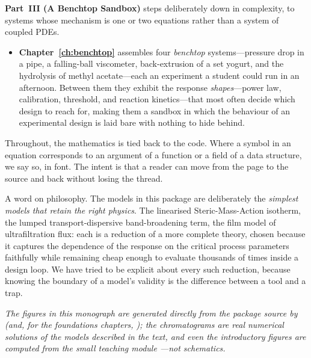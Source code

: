 \textbf{Part~III (A Benchtop Sandbox)} steps deliberately down in complexity, to
systems whose mechanism is one or two equations rather than a system of coupled
PDEs.

\begin{itemize}
  \item \textbf{Chapter~\ref{ch:benchtop}} assembles four \emph{benchtop}
  systems---pressure drop in a pipe, a falling-ball viscometer, back-extrusion of
  a set yogurt, and the hydrolysis of methyl acetate---each an experiment a
  student could run in an afternoon. Between them they exhibit the response
  \emph{shapes}---power law, calibration, threshold, and reaction kinetics---that
  most often decide which design to reach for, making them a sandbox in which the
  behaviour of an experimental design is laid bare with nothing to hide behind.
\end{itemize}

Throughout, the mathematics is tied back to the code. Where a symbol in an
equation corresponds to an argument of a function or a field of a data
structure, we say so, in  font. The intent is that a reader can
move from the page to the source and back without losing the thread.

A word on philosophy. The models in this package are deliberately the
\emph{simplest models that retain the right physics}. The linearised
Steric-Mass-Action isotherm, the lumped transport-dispersive band-broadening
term, the film model of ultrafiltration flux: each is a reduction of a more
complete theory, chosen because it captures the dependence of the response on
the critical process parameters faithfully while remaining cheap enough to
evaluate thousands of times inside a design loop. We have tried to be explicit
about every such reduction, because knowing the boundary of a model's validity
is the difference between a tool and a trap.

\vspace{1em}
{\itshape\noindent
The figures in this monograph are generated directly from the package source by
 (and, for the foundations chapters,
); the chromatograms are real numerical
solutions of the models described in the text, and even the introductory figures
are computed from the small teaching module
---not schematics.\par}
